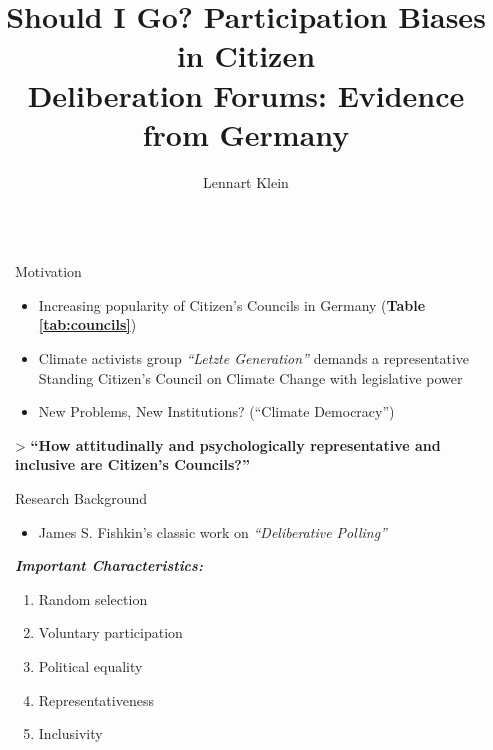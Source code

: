 \documentclass[final]{beamer}
\title{Should I Go? Participation Biases in  Citizen\\Deliberation Forums: Evidence from Germany}
\author{Lennart Klein \inst{1}}
\institute[shortinst]{\inst{1} University of Tübingen}
\newlength{\sepwidth}
\newlength{\colwidth}
\newcommand{\separatorcolumn}{\begin{column}{\sepwidth}\end{column}}
\begin{document}
\begin{frame}[t]
\begin{columns}[t]
\separatorcolumn

\begin{column}{\colwidth}

  \begin{block}{Motivation}

  \begin{itemize}
        \item Increasing popularity of Citizen's Councils in Germany (\textbf{Table \ref{tab:councils}})
        \item Climate activists group \textit{``Letzte Generation''} demands a representative Standing Citizen's Council on Climate Change with legislative power
        \item New Problems, New Institutions? (``Climate Democracy'')
  \end{itemize}

  \vspace{1ex}
  > \textbf{``How attitudinally and psychologically representative and inclusive are Citizen's Councils?''}        
  \vspace{2ex}


  
  \end{block}

  \begin{block}{Research Background}


    \begin{itemize}
        \item James S. Fishkin's \citeyearpar{fishkin1991DemocracyDeliberation} classic work on \textit{``Deliberative Polling''}
    \end{itemize}
    
    \textit{\textbf{Important Characteristics:}}
        \begin{enumerate}
            \item Random selection
            \item Voluntary participation
            \item Political equality
            \item Representativeness
            \item Inclusivity
        \end{enumerate}


\end{block}
\end{column}
\end{columns}
\end{frame}
\end{document}
